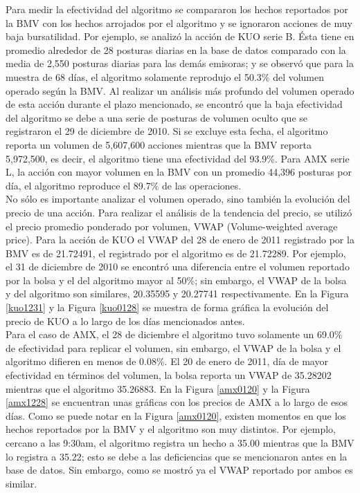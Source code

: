 \documentclass[11pt]{article}
\numberwithin{equation}{section} %
\begin{document}
Para medir la efectividad del algoritmo se compararon los hechos reportados por la BMV con los hechos arrojados por el algoritmo y se ignoraron acciones de muy baja bursatilidad. Por ejemplo, se analizó la acción de KUO serie B. Ésta tiene en promedio alrededor de 28 posturas diarias en la base de datos comparado con la media de 2,550 posturas diarias para las demás emisoras; y se observó que para la muestra de 68 días, el algoritmo solamente reprodujo el 50.3\% del volumen operado según la BMV. Al realizar un análisis más profundo del volumen operado de esta acción durante el plazo mencionado, se encontró que la baja efectividad del algoritmo se debe a una serie de posturas de volumen oculto que se registraron el 29 de diciembre de 2010. Si se excluye esta fecha, el algoritmo reporta un volumen de 5,607,600 acciones mientras que la BMV reporta 5,972,500, es decir, el algoritmo tiene una efectividad del 93.9\%. Para AMX serie L, la acción con mayor volumen en la BMV con un promedio 44,396 posturas por día, el algoritmo reproduce el 89.7\% de las operaciones.\\


No sólo es importante analizar el volumen operado, sino también la evolución del precio de una acción. Para realizar el análisis de la tendencia del precio, se utilizó el precio promedio ponderado por volumen, VWAP (Volume-weighted average price). Para la acción de KUO el VWAP del 28 de enero de 2011 registrado por la BMV es de 21.72491, el registrado por el algoritmo es de 21.72289. Por ejemplo, el 31 de diciembre de 2010 se encontró una diferencia entre el volumen reportado por la bolsa y el del algoritmo mayor al 50\%; sin embargo, el VWAP de la bolsa y del algoritmo son similares, 20.35595 y 20.27741 respectivamente. En la Figura \ref{kuo1231} y la Figura \ref{kuo0128} se muestra de forma gráfica la evolución del precio de KUO a lo largo de los días mencionados antes.\\

Para el caso de AMX, el 28 de diciembre el algoritmo tuvo solamente un 69.0\% de efectividad para replicar el volumen, sin embargo, el VWAP de la bolsa y el algoritmo difieren en menos de 0.08\%. El 20 de enero de 2011, día de mayor efectividad en términos del volumen, la bolsa reporta un VWAP de 35.28202 mientras que el algoritmo 35.26883. En la Figura \ref{amx0120} y la Figura \ref{amx1228} se encuentran unas gráficas con los precios de AMX a lo largo de esos días. Como se puede notar en la Figura \ref{amx0120}, existen momentos en que los hechos reportados por la BMV y el algoritmo son muy distintos. Por ejemplo, cercano a las 9:30am, el algoritmo registra un hecho a 35.00 mientras que la BMV lo registra a 35.22; esto se debe a las deficiencias que se mencionaron antes en la base de datos. Sin embargo, como se mostró ya el VWAP reportado por ambos es similar.
\end{document}
